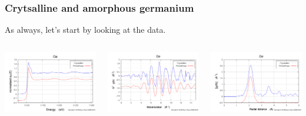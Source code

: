 \documentclass[10pt, xcolor=x11names, compress]{beamer}
\begin{document}
\begin{frame}
  \frametitle{Crytsalline and amorphous germanium}

  As always, let's start by looking at the data.

  \bigskip

  \begin{columns}
    \begin{column}{0.33\linewidth}
      \includegraphics[width=\linewidth]{images/Ge_mu.png}
    \end{column}
    \begin{column}{0.33\linewidth}
      \includegraphics[width=\linewidth]{images/Ge_chik.png}
    \end{column}
    \begin{column}{0.33\linewidth}
      \includegraphics[width=\linewidth]{images/Ge_chir.png}

\end{column}
\end{columns}
\end{frame}
\end{document}
